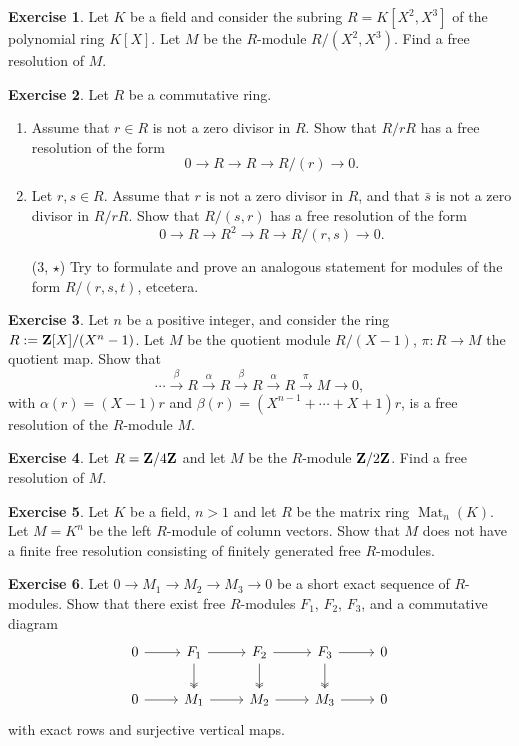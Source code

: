\documentclass[11pt]{amsbook}
\newcommand{\longto}{\longrightarrow}
\DeclareMathOperator\Mat{Mat}
\theoremstyle{plain}
\theoremstyle{definition}
\newtheorem{exercise}{Exercise}
\begin{document}
\begin{exercise}Let $K$ be a field and consider the subring $R=K[X^2,X^3]$ of the polynomial ring $K[X]$. Let $M$ be the $R$-module $R/(X^2,X^3)$. Find a free resolution of $M$.
\end{exercise}


\begin{exercise}
Let $R$ be a commutative ring. 
\begin{enumerate}
\item Assume that $r\in R$ is not a zero divisor in $R$. Show that $R/rR$ has a free resolution of the form
\[
	0 \longto R \longto R \longto R/(r) \longto 0.
\]
\item Let $r,s\in R$. Assume that $r$ is not a zero divisor in $R$, and that $\bar{s}$ is not a zero divisor in $R/rR$. Show that $R/(s,r)$ has a free resolution of the form
\[
	 0 \longto R \longto R^2 \longto R \longto R/(r,s) \longto 0.
\]
\item[(3, $\star$)] Try to formulate and prove an analogous statement for modules of the form $R/(r,s,t)$, etcetera.
\end{enumerate}
\end{exercise}

\begin{exercise}\label{exc:free-resolution-finite-cyclic-group}
Let $n$ be a positive integer, and consider the ring $R := {\mathbf{Z}}[X]/(X^n-1)$. Let $M$ be the quotient module $R/(X-1)$, $\pi \colon R\to M$ the quotient map. Show that
\[
	\cdots \overset{\beta}\longto R \overset{\alpha}\longto R \overset{\beta}\longto R \overset{\alpha}\longto R \overset{\pi}{\longto} M \longto 0,
\]
with $\alpha(r) = (X-1)r$ and $\beta(r)=(X^{n-1} + \cdots + X + 1)r$, is a free resolution of the $R$-module $M$. 
\end{exercise}



\begin{exercise}
Let $R={\mathbf{Z}}/4{\mathbf{Z}}$ and let $M$ be the $R$-module ${\mathbf{Z}}/2{\mathbf{Z}}$. Find a free resolution of $M$.
\end{exercise}

\begin{exercise}
Let $K$ be a field, $n>1$ and let $R$ be the matrix ring $\Mat_n(K)$. Let $M=K^n$ be the left $R$-module of column vectors. Show that $M$ does not have a finite free resolution consisting of finitely generated free $R$-modules.
\end{exercise}

\begin{exercise}
Let $0\to M_1\to M_2 \to M_3 \to 0$ be a short exact sequence of $R$-modules. Show that there exist free $R$-modules $F_1$, $F_2$, $F_3$, and a commutative diagram
\[
\begin{tikzcd}
 0 \arrow{r} & F_1 \arrow{r} \arrow[two heads]{d}
 	& F_2 \arrow{r} \arrow[two heads]{d}
	& F_3 \arrow{r} \arrow[two heads]{d} & 0 \\
0 \arrow{r} & M_1 \arrow{r} & M_2  \arrow{r} & M_3 \arrow{r} & 0
\end{tikzcd}
\]
with exact rows and surjective vertical maps.
\end{exercise}
\end{document}

